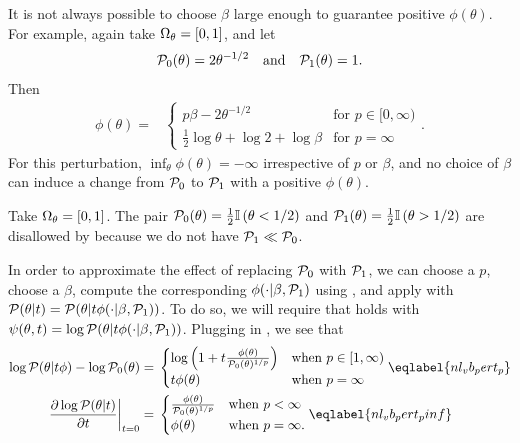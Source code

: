 \begin{ex}
%
It is not always possible to choose $\beta$ large enough to guarantee positive
$\phi(\theta)$. For example, again take $\Omega_{\theta}=[0,1]$, and let
%
\begin{align*}
%
\pbase(\theta) ={} 2 \theta^{-1/2} \mathand
\palt(\theta) ={} 1.
%
\end{align*}
%
Then
%
\begin{align*}
%
\phi(\theta) ={}&
\begin{cases}
        p\beta - 2 \theta^{-1/2} & \textrm{for }p \in [0, \infty) \\
        \frac{1}{2} \log \theta + \log 2 + \log \beta
            & \textrm{for }p = \infty
\end{cases}.
%
\end{align*}
%
For this perturbation, $\inf_\theta \phi(\theta) = -\infty$ irrespective
of $p$ or $\beta$, and no choice of $\beta$ can induce a change from
$\mathcal{P}_{0}$ to $\mathcal{P}_{1}$ with a positive $\phi(\theta)$.
%
\end{ex}

\begin{ex}
%
Take $\Omega_{\theta} = [0,1]$.  The pair $\mathcal{P}_{0}(\theta)  = \frac{1}{2}\mathbb{I}\left(\theta <
1/2\right)$ and $\mathcal{P}_{1}(\theta) = \frac{1}{2} \mathbb{I}\left(\theta > 1/2\right)$ are disallowed by
 because we do not have $\mathcal{P}_{1} \ll \mathcal{P}_{0}$.
%
\end{ex}


In order to approximate the effect of replacing $\mathcal{P}_{0}$ with $\mathcal{P}_{1}$, we can
choose a $p$, choose a $\beta$, compute the corresponding $\phi(\cdot \vert
\beta, \mathcal{P}_{1})$ using , and apply  with
$\mathcal{P}(\theta \vert t) = \mathcal{P}(\theta \vert t \phi(\cdot \vert \beta, \mathcal{P}_{1}))$.
To do so, we will require that  holds with
$\psi(\theta, t) = \log \mathcal{P}(\theta \vert t \phi(\cdot \vert \beta, \mathcal{P}_{1}))$.
Plugging in , we see that
%
%
\begin{align}
%
\logp(\theta \vert \t \phi) - \log \pbase(\theta) ={}&
\begin{cases}
    \log\left(1 + \t \frac{\phi(\theta)}{\pbase(\theta)^{1/p}}\right)
    & \textrm{when }p \in [1, \infty) \\
    \t \phi(\theta)
    & \textrm{when }p = \infty
%
\end{cases}  \eqlabel{nl_vb_pert_p}\\
%
\fracat{\partial \log \p(\theta \vert \t)}{\partial \t}{\t=0} ={}&
\begin{cases}
   \frac{\phi(\theta)}{\pbase(\theta)^{1/p}}
   & \textrm{when }p < \infty \\
   \phi(\theta)
   & \textrm{when }p = \infty.
\end{cases}\eqlabel{nl_vb_pert_pinf}
%
\end{align}

